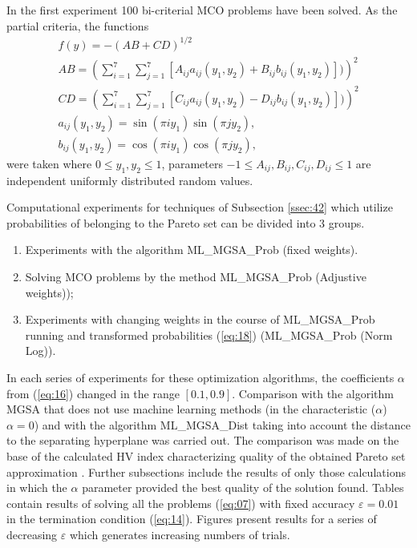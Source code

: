 \documentclass[runningheads]{llncs}
\begin{document}
In the first experiment 100 bi-criterial MCO problems have been solved. As the partial criteria, the functions \cite{ML_MCO_2023} 
\begin{equation}
    \label{eq:19}
		\begin{matrix}
		  f(y)= -(AB + CD)^{1/2} \\
			AB =(\sum_{i=1}^7{\sum_{j=1}^7{[A_{ij} a_{ij} (y_1,y_2) + B_{ij} b_{ij} (y_1,y_2)])}})^2 \\
			CD =(\sum_{i=1}^7{\sum_{j=1}^7{[C_{ij} a_{ij} (y_1,y_2) - D_{ij} b_{ij} (y_1,y_2)])}})^2 \\
			a_{ij} (y_1,y_2) = \sin(\pi i y_1) \sin(\pi j y_2), \\
			b_{ij} (y_1,y_2) = \cos(\pi i y_1) \cos(\pi j y_2),
		\end{matrix}
\end{equation}
were taken  where $0 \leq y_1, y_2 \leq 1$, parameters $-1 \leq A_{ij},B_{ij},C_{ij},D_{ij} \leq 1$ are independent uniformly distributed random values.

Computational experiments for techniques of Subsection \ref{ssec:42} which utilize probabilities of belonging to the Pareto set can be divided into 3 groups.
\begin{enumerate}
	\item 	Experiments with the algorithm ML\_MGSA\_Prob (fixed weights).
	\item 	Solving MCO problems by the method ML\_MGSA\_Prob (Adjustive weights));
	\item 	Experiments with changing weights in the course of ML\_MGSA\_Prob running and transformed probabilities (\ref{eq:18})  (ML\_MGSA\_Prob (Norm Log)).
\end{enumerate}
	
In each series of experiments for these optimization algorithms, the coefficients $\alpha$ from (\ref{eq:16}) changed in the range $[0.1, 0.9]$. Comparison with the algorithm MGSA that does not use machine learning methods (in the characteristic ($\alpha$) $\alpha = 0$) and with the algorithm ML\_MGSA\_Dist taking into account the distance to the separating hyperplane was carried out. The comparison was made on the base of  the calculated HV index characterizing quality of the obtained Pareto set approximation \cite{ML_MCO_2023,Evtushenko2014}. Further subsections include the results of only those calculations in which the $\alpha$ parameter provided the best quality of the solution found. Tables contain results of solving all the problems (\ref{eq:07}) with fixed accuracy $\varepsilon=0.01$ in the termination condition (\ref{eq:14}). Figures present results for a series of decreasing $\varepsilon$ which generates increasing numbers of trials.
\end{document}
